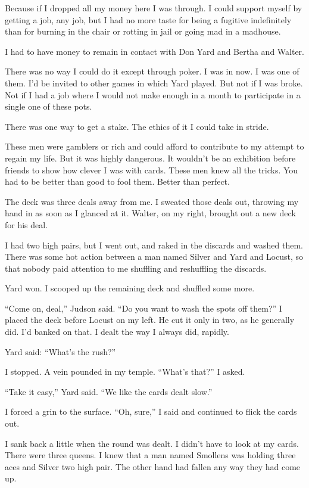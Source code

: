 \documentclass{novel}
\begin{document}
Because if I dropped all my money here I was through. I could support myself by getting a job, any job, but I had no more taste for being a fugitive indefinitely than for burning in the chair or rotting in jail or going mad in a madhouse. 

I had to have money to remain in contact with Don Yard and Bertha and Walter.

There was no way I could do it except through poker. I was in now. I was one of them. I’d be invited to other games in which Yard played. But not if I was broke. Not if I had a job where I would not make enough in a month to participate in a single one of these pots.

There was one way to get a stake. The ethics of it I could take in stride.

These men were gamblers or rich and could afford to contribute to my attempt to regain my life. But it was highly dangerous. It wouldn’t be an exhibition before friends to show how clever I was with cards. These men knew all the tricks. You had to be better than good to fool them. Better than perfect.

\scenestars

The deck was three deals away from me. I sweated those deals out, throwing my hand in as soon as I glanced at it. Walter, on my right, brought out a new deck for his deal.

I had two high pairs, but I went out, and raked in the discards and washed them. There was some hot action between a man named Silver and Yard and Locust, so that nobody paid attention to me shuffling and reshuffling the discards.

Yard won. I scooped up the remaining deck and shuffled some more.

“Come on, deal,” Judson said. “Do you want to wash the spots off them?” I placed the deck before Locust on my left. He cut it only in two, as he generally did. I’d banked on that. I dealt the way I always did, rapidly.

Yard said: “What’s the rush?”

I stopped. A vein pounded in my temple. “What’s that?” I asked.

“Take it easy,” Yard said. “We like the cards dealt slow.”

I forced a grin to the surface. “Oh, sure,” I said and continued to flick the cards out.

I sank back a little when the round was dealt. I didn’t have to look at my cards. There were three queens. I knew that a man named Smollens was holding three aces and Silver two high pair. The other hand had fallen any way they had come up.
\end{document}
